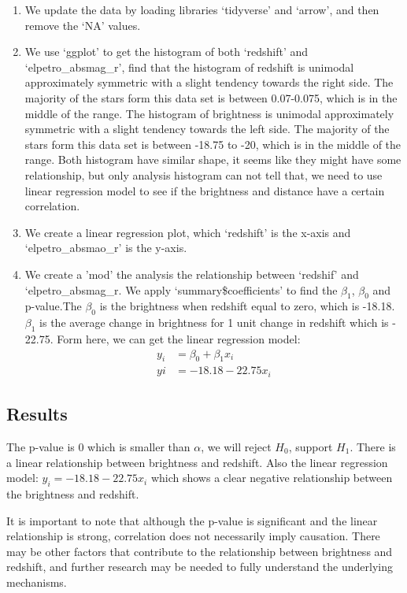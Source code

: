 \documentclass[12pt]{article}
\begin{document}
\begin{enumerate}
	\item We update the data by loading libraries `tidyverse' and `arrow'\cite{CRAN}, and then remove the `NA' values.
	\item We use `ggplot' to get the histogram of both  `redshift'  and `elpetro\_absmag\_r', find that the histogram of redshift is unimodal approximately symmetric with a slight tendency towards the right side. The majority of the stars form this data set is between 0.07-0.075, which is in the middle of the range. The histogram of brightness is unimodal approximately symmetric with a slight tendency towards the left side. The majority of the stars form this data set is between -18.75 to -20, which is in the middle of the range. Both histogram have similar shape, it seems like they might have some relationship, but only analysis histogram can not tell that, we need to use linear regression model to see if the brightness and distance have a certain correlation.
	\item We create a linear regression plot, which `redshift' is the x-axis and ‘elpetro\_absmao\_r’ is the y-axis.
	\item We create a 'mod' the analysis the relationship between `redshif' and `elpetro\_absmag\_r. We apply `summary\$coefficients' to find the $\beta_1$, $\beta_0$ and p-value.The $\beta_0$ is the brightness when redshift equal to zero, which is -18.18. $\beta_1$ is the average change in brightness for 1 unit change in redshift which is - 22.75. Form here, we can get the linear regression model:
\begin{align*}
	y_i &= \beta_0 + \beta_1 x_i \\
	yi &= -18.18  - 22.75x_i 
\end{align*}

\end{enumerate}

\subsection{Results}
The p-value is 0 which is smaller than $\alpha$, we will reject $H_0$, support $H_1$. There is a linear relationship between brightness and redshift. Also the linear regression model: $y_i = -18.18 - 22.75x_i$ which shows a clear negative relationship between the brightness and redshift.

\noindent
It is important to note that although the p-value is significant and the linear relationship is strong, correlation does not necessarily imply causation. There may be other factors that contribute to the relationship between brightness and redshift, and further research may be needed to fully understand the underlying mechanisms.
\end{document}
